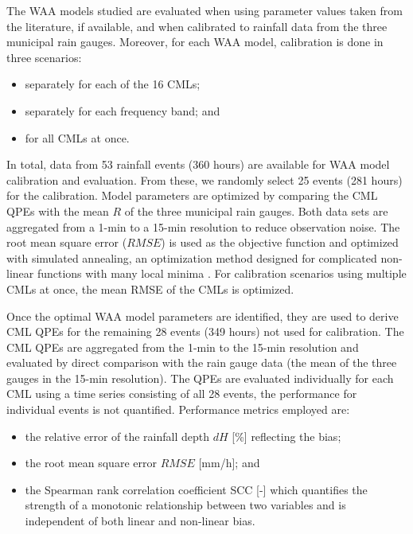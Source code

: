 \documentclass{ctuthesis}\usepackage[]{graphicx}\usepackage[]{color}
\begin{document}
The WAA models studied are evaluated when using parameter values taken from the literature, if available, and when calibrated to rainfall data from the three municipal rain gauges. Moreover, for each WAA model, calibration is done in three scenarios:
        \begin{itemize}
        \itemsep0em 
                \item{separately for each of the 16 CMLs;}
                \item{separately for each frequency band; and}
                \item{for all CMLs at once.}
        \end{itemize}
In total, data from 53 rainfall events (360 hours) are available for WAA model  calibration and evaluation. From these, we randomly select 25 events (281 hours) for the calibration. Model parameters are optimized by comparing the CML QPEs with the mean $R$ of the three municipal rain gauges. Both data sets are aggregated from a 1-min to a 15-min resolution to reduce observation noise. The root mean square error ($R\!M\!S\!E$) is used as the objective function and optimized with simulated annealing, an optimization method designed for complicated non-linear functions with many local minima \citep{xiangGeneralizedSimulatedAnnealing2013}. For calibration scenarios using multiple CMLs at once, the mean RMSE of the CMLs is optimized.

Once the optimal WAA model parameters are identified, they are used to derive CML QPEs for the remaining 28 events (349 hours) not used for calibration. The CML QPEs are aggregated from the 1-min to the 15-min resolution and evaluated by direct comparison with the rain gauge data (the mean of the three gauges in the 15-min resolution). The QPEs are evaluated individually for each CML using a time series consisting of all 28 events, the performance for individual events is not quantified. Performance metrics employed are: 
        \begin{samepage}
        \begin{itemize}
        \itemsep0em 
                \item{the relative error of the rainfall depth $d\!H$ [\%] reflecting the bias;}
                \item{the root mean square error $R\!M\!S\!E$ [mm/h]}; and
                \item{the Spearman rank correlation coefficient SCC [-] which quantifies the strength of a monotonic relationship between two variables and is independent of both linear and non-linear bias.}
        \end{itemize}
        \end{samepage}
\end{document}
